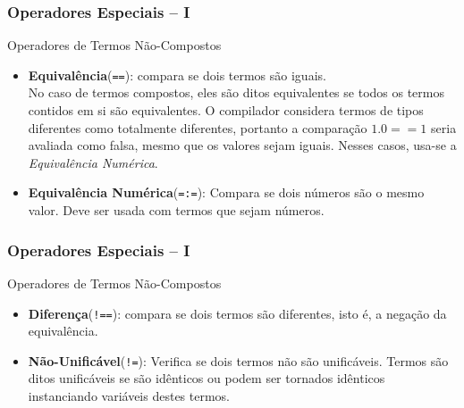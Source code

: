 \begin{frame}[fragile]

    \frametitle{Operadores Especiais -- I}
    
    \begin{block}{Operadores de Termos Não-Compostos}

		\begin{itemize}
	
	
          \item \textbf{Equivalência}(\verb+==+): compara se dois termos são iguais.\\No caso de termos
            compostos, eles são ditos equivalentes se todos os termos contidos em si são equivalentes. O 
            compilador considera termos de tipos diferentes como totalmente diferentes, portanto a   comparação  $1.0 == 1$ seria avaliada como falsa, mesmo que os valores sejam iguais. Nesses casos, usa-se a  \emph{Equivalência Numérica}.

      \pause
            \item \textbf{Equivalência Numérica}(\verb+=:=+): Compara se dois números são o mesmo valor.
            Deve ser usada com termos que sejam números.

  	\end{itemize}
    \end{block}

\end{frame}

\begin{frame}[fragile]

    \frametitle{Operadores Especiais -- I}
    
    \begin{block}{Operadores de Termos Não-Compostos}

		\begin{itemize}

    \item \textbf{Diferença}(\verb+!==+): compara se dois termos são diferentes, isto é, a negação da  equivalência.

      \pause
            \item \textbf{Não-Unificável}(\verb+!=+): Verifica se dois termos não são unificáveis. Termos são  ditos unificáveis se são idênticos ou podem ser tornados idênticos instanciando variáveis destes 
            termos.
	\end{itemize}
    \end{block}

\end{frame}



